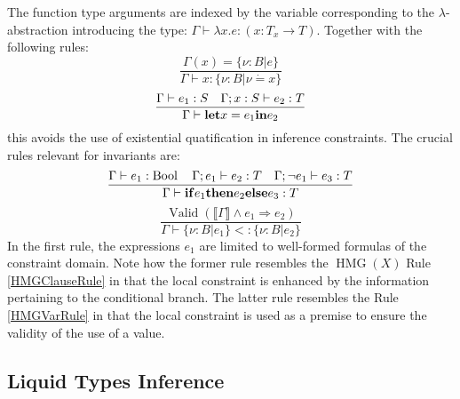 \documentclass{article}
\newcommand{\tmop}[1]{\ensuremath{\operatorname{#1}}}
\newcommand{\tmstrong}[1]{\textbf{#1}}
\begin{document}
The function type arguments are indexed by the variable corresponding to the
$\lambda$-abstraction introducing the type: $\Gamma \vdash \lambda x.e : (x :
T_x \rightarrow T)$. Together with the following rules:
\[ \frac{\Gamma (x) = \{ \nu : B | e \}}{\Gamma \vdash x : \{ \nu : B | \nu
   \dot{=} x \}} \]
\[ \frac{\Gamma \vdash e_1 : S \text{ \ \ } \Gamma ; x : S \vdash e_2 :
   T}{\Gamma \vdash \text{{\tmstrong{let}}} x = e_1  \text{{\tmstrong{in}}}
   e_2} \]
this avoids the use of existential quatification in inference constraints. The
crucial rules relevant for invariants are:
\[ \frac{\Gamma \vdash e_1 : \tmop{Bool} \text{ \ \ } \Gamma ; e_1 \vdash e_2
   : T \text{ \ \ } \Gamma ; \neg e_1 \vdash e_3 : T}{\Gamma \vdash
   \text{{\tmstrong{if}}} e_1  \text{{\tmstrong{then}}} e_2 
   \text{{\tmstrong{else}}} e_3 : T} \]
\[ \frac{\tmop{Valid} (\llbracket \Gamma \rrbracket \wedge e_1 \Rightarrow
   e_2)}{\Gamma \vdash \{ \nu : B | e_1 \} < : \{ \nu : B | e_2 \}} \]
In the first rule, the expressions $e_1$ are limited to well-formed formulas
of the constraint domain. Note how the former rule resembles the $\tmop{HMG}
(X)$ Rule \ref{HMGClauseRule} in that the local constraint is enhanced by the
information pertaining to the conditional branch. The latter rule resembles
the Rule \ref{HMGVarRule} in that the local constraint is used as a premise to
ensure the validity of the use of a value.

\subsection{Liquid Types Inference}
\end{document}
